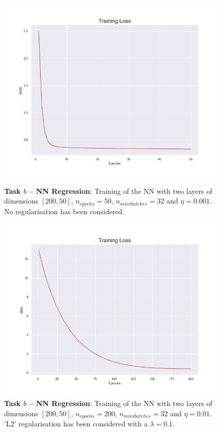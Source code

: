 \documentclass[english,notitlepage,reprint,nofootinbib]{revtex4-1}  %
\begin{document}
\begin{figure}[h]
    \centering 
    \includegraphics[scale=0.35]{NN/RegrNN_200_50_None_32_50_0.0002.jpg}
    \caption{\textbf{Task $b$ – NN Regression}: Training of the NN with two layers of dimensions $[200,50]$, $n_{epochs}=50$, $n_{minibatches}=32$ and $\eta=0.001$. No regularisation has been considered.}
    \label{fig:train_noreg}
    \centering 
    \includegraphics[scale=0.35]{NN/RegrNN_200_50_L2_32_50_0.0002.jpg}
    \caption{\textbf{Task $b$ – NN Regression}: Training of the NN with two layers of dimensions $[200,50]$, $n_{epochs}=200$, $n_{minibatches}=32$ and $\eta=0.01$. 'L2' regularisation has been considered with a $\lambda=0.1$.}
    \label{fig:train_reg}
\end{figure}
\end{document}

